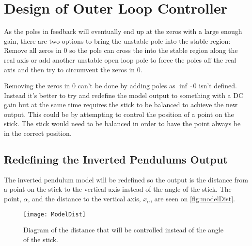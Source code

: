 \section{Design of Outer Loop Controller}
As the poles in feedback will eventually end up at the zeros with a large enough gain, there are two options to bring the unstable pole into the stable region: Remove all zeros in 0 so the pole can cross the into the stable region along the real axis or add another unstable open loop pole to force the poles off the real axis and then try to circumvent the zeros in 0. 

Removing the zeros in 0 can't be done by adding poles as $\inf\cdot0$ isn't defined. Instead it's better to try and redefine the model output to something with a DC gain but at the same time requires the stick to be balanced to achieve the new output. This could be by attempting to control the position of a point on the stick. The stick would need to be balanced in order to have the point always be in the correct position.


\subsection{Redefining the Inverted Pendulums Output}
The inverted pendulum model will be redefined so the output is the distance from a point on the stick to the vertical axis instead of the angle of the stick. The point, $\alpha$, and the distance to the vertical axis, $x_\alpha$, are seen on \autoref{fig:modelDist}.

\begin{figure}[htbp]
\centering
\texttt{[image: ModelDist]}
\caption{Diagram of the distance that will be controlled instead of the angle of the stick.}
\label{fig:modelDist}
\end{figure}


